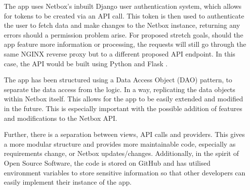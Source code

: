 \documentclass [11pt,a4paper]{article}
\begin{document}
The app uses Netbox's inbuilt Django user authentication system, which allows for tokens to be created via an API call. This token is then used to authenticate the user to fetch data and make changes to the Netbox instance, returning any errors should a permission problem arise. For proposed stretch goals, should the app feature more information or processing, the requests will still go through the same NGINX reverse proxy but to a different proposed API endpoint. In this case, the API would be built using Python and Flask \cite{flask}. 

The app has been structured using a Data Access Object (DAO) pattern\cite{dao}, to separate the data access from the logic. In a way, replicating the data objects within Netbox itself. This allows for the app to be easily extended and modified in the future. This is especially important with the possible addition of features and modifications to the Netbox API.

Further, there is a separation between views, API calls and providers. This gives a more modular structure and provides more maintainable code, especially as requirements change, or Netbox updates/changes. Additionally, in the spirit of Open Source Software, the code is stored on GitHub \cite{keeptrackgithub} and has utilised environment variables to store sensitive information so that other developers can easily implement their instance of the app.
\end{document}
